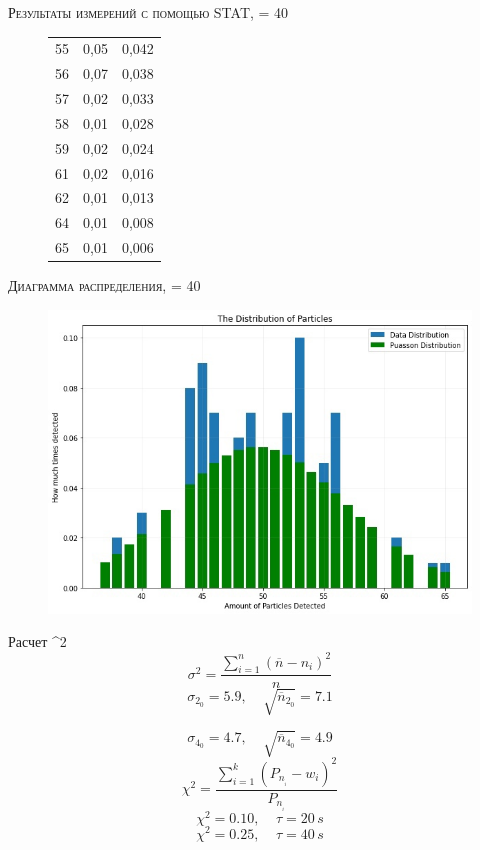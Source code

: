 \documentclass{beamer}%
\begin{document}
\begin{frame}{\textsc{Результаты измерений с помощью STAT}, \tau = 40}
\begin{figure}[ht]
\begin{minipage}{.5\textwidth}
\begin{table}[t]
\begin{tabular}{|c | c | c |}
                    55	&   0,05    &	0,042 \\
                    56	&   0,07    &	0,038 \\
                    57	&   0,02    &	0,033 \\
                    58	&   0,01    &	0,028 \\
                    59	&   0,02    &	0,024 \\
                    61	&   0,02    &	0,016 \\
                    62	&   0,01    &	0,013 \\
                    64	&   0,01    &	0,008 \\
                    65	&   0,01    &	0,006 \\ [1ex]
                    \hline
                \end{tabular}
            \end{table}
        \end{minipage}
    \end{figure}
\end{frame}

\begin{frame}{\textsc{Диаграмма распределения}, \tau = 40}
    \begin{figure}[ht]
        \includegraphics[width=1.0\linewidth]{images/t_40_distribution.jpg}
    \end{figure}
\end{frame}

\begin{frame}{Расчет \chi^2}
        $$\sigma^2 = \frac{\sum\limits_{i=1}^n (\overline{n} - n_i)^2}{n}$$
        $$\sigma_2_0 = 5.9, \;\;\;\; \sqrt{\overline{n}_2_0} = 7.1$$
        
        $$\sigma_4_0 = 4.7,  \;\;\;\; \sqrt{\overline{n}_4_0} = 4.9$$
        $$\chi^2 = \frac{\sum\limits_{i=1}^k ({P_n__i} - w_i)^2}{P_n__i}$$
        $${\chi^2} = 0.10, \;\;\;\; \tau = 20\,s$$
        $${\chi^2} = 0.25, \;\;\;\; \tau = 40\,s$$
\end{frame}
\end{document}
